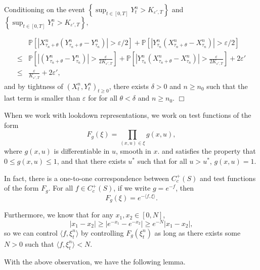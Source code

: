 \documentclass[12pt]{article}
\newenvironment {proof}{{\noindent\bf Proof }}{\hfill $\Box$ \medskip}
\begin{document}
\begin{proof}
Conditioning on the event $\left\{ \sup_{t\in [0,T]}Y^n_t > K_{\varepsilon',T} \right\}$ and $\left\{ \sup_{t\in [0,T]}Y^n_t > K_{\varepsilon',T} \right\},$

\begin{equation}
\begin{aligned}
& \mathbb{P}\left[|X^n_{\tau_n+\theta}(Y^n_{\tau_n+\theta}-Y^n_{\tau_n})|> \varepsilon/2 \right] + \mathbb{P}\left[ | Y^n_{\tau_n}( X^n_{\tau_n+\theta}- X^n_{\tau_n}) |> \varepsilon/2 \right]\\
\leq & \mathbb{P}\left[|(Y^n_{\tau_n+\theta}-Y^n_{\tau_n})|> \frac{\varepsilon}{2K_{\varepsilon',T}}\right] + \mathbb{P}\left[ | Y^n_{\tau_n}( X^n_{\tau_n+\theta}- X^n_{\tau_n}) |> \frac{\varepsilon}{2K_{\varepsilon',T}}\right] + 2 \varepsilon'\\
\leq & \frac{\varepsilon}{K_{\varepsilon',T}}+2 \varepsilon',
\end{aligned}
\end{equation}
and by tightness of $(X^n_t, Y^n_t)_{t \geq 0}$,
there exists $\delta > 0$ and $n \geq n_0$ such that the last term is smaller than $\varepsilon$ for 
for all $\theta < \delta$ and $n\geq n_0$.
\end{proof}


When we work with lookdown representations, we work on test functions of the form
\begin{equation}
F_g(\xi) = \prod_{(x,u) \in \xi} g(x,u),
\end{equation}
where $g(x,u)$ is differentiable in $u$, smooth in $x$.
and satisfies the property that $0\leq g(x,u) \leq 1$,
and that there exists $u^*$ such that for all $u > u^*$,
$g(x, u) =1$.

In fact, there is a one-to-one correspondence between $C^{+}_c(S)$
and test functions of the form $F_g$.
For all $f \in C^{+}_c(S)$,
if we write $g = e^{-f}$,
then
\begin{equation}
F_g(\xi)= e^{-\langle f, \xi \rangle}.
\end{equation}

Furthermore,
we know that for any $x_1, x_2 \in [0,N]$,
$$|x_1-x_2|\geq |e^{-x_1}-e^{-x_2}| \geq e^{-N}|x_1-x_2|,$$
so we can control $\langle f, \xi^n_t \rangle $ by controlling $F_g(\xi^n_t)$ as long as 
there exists some $N > 0$ such that $\langle f, \xi^n_t \rangle < N$.

With the above observation,
we have the following lemma.
\end{document}
